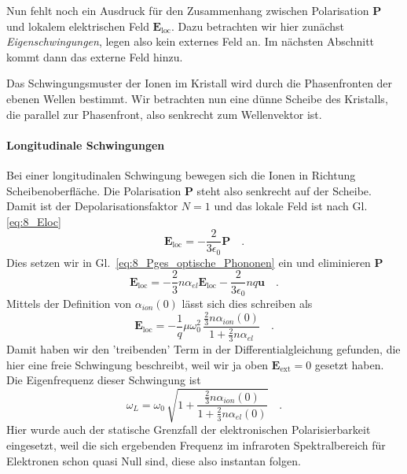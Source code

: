 Nun fehlt noch ein Ausdruck für den Zusammenhang zwischen Polarisation $\bm{P}$ und lokalem elektrischen Feld $\bm{E}_\text{loc}$. Dazu betrachten wir hier zunächst \emph{Eigenschwingungen}, legen also kein externes Feld an. Im nächsten Abschnitt kommt dann das externe Feld hinzu.

Das Schwingungsmuster der Ionen im Kristall wird durch die Phasenfronten der ebenen Wellen bestimmt. Wir betrachten nun eine dünne Scheibe des Kristalls, die parallel zur Phasenfront, also senkrecht zum Wellenvektor ist.


\paragraph*{Longitudinale Schwingungen} Bei einer longitudinalen Schwingung bewegen sich die Ionen in Richtung Scheibenoberfläche. Die Polarisation $\bm{P}$ steht also senkrecht auf der Scheibe. Damit ist der Depolarisationsfaktor $N=1$ und das lokale Feld ist nach Gl.     \ref{eq:8_Eloc}
\begin{equation}
    \bm{E}_\text{loc}  = - \frac{2}{3\epsilon_0} \bm{P} \quad .
\end{equation}
Dies setzen wir in Gl.~\ref{eq:8_Pges_optische_Phononen} ein und eliminieren $\bm{P}$
\begin{equation}
    \bm{E}_\text{loc} = - \frac{2}{3} n \alpha_{el} \bm{E}_\text{loc}  - \frac{2}{3\epsilon_0} n q \bm{u} \quad .
\end{equation}
Mittels der Definition von $\alpha_{ion}(0)$  lässt sich dies schreiben als
\begin{equation}
    \bm{E}_\text{loc} = - \frac{1}{q} \mu \omega_0^2 \, \frac{\frac{2}{3} n \alpha_{ion}(0)}{1 + \frac{2}{3} n \alpha_{el} } \quad .
\end{equation}
Damit haben wir den 'treibenden' Term in der Differentialgleichung gefunden, die hier eine freie Schwingung beschreibt, weil wir ja oben $\bm{E}_\text{ext} = 0$ gesetzt haben. Die Eigenfrequenz dieser Schwingung ist
\begin{equation}
    \omega_L = \omega_0 \, \sqrt{1 + \frac{\frac{2}{3} n \alpha_{ion}(0)}{1 + \frac{2}{3} n \alpha_{el}(0) }} \quad .
\end{equation}
Hier wurde auch der statische Grenzfall der elektronischen Polarisierbarkeit eingesetzt, weil die sich ergebenden Frequenz im infraroten Spektralbereich für Elektronen schon quasi Null sind, diese also instantan folgen.


